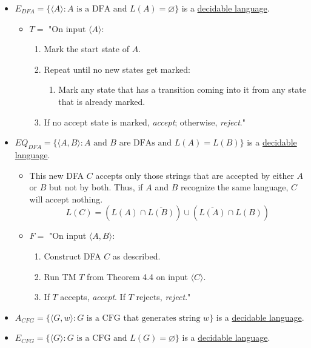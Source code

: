 \documentclass[12pt]{article}
\begin{document}
\begin{itemize}
\item \(E_{DFA}=\{\langle A\rangle : A \text{ is a DFA and } L(A)=\varnothing\}\)
is a \uline{decidable language}.
\begin{itemize}
\item \(T=\) "On input \(\langle A \rangle\):
\begin{enumerate}
\item Mark the start state of \(A\).
\item Repeat until no new states get marked:
\begin{enumerate}
\item Mark any state that has a transition coming into it from any state that
is already marked.
\end{enumerate}
\item If no accept state is marked, \emph{accept}; otherwise, \emph{reject}."
\end{enumerate}
\end{itemize}

\item \(EQ_{DFA}=\{\langle A,B \rangle : A \text{ and } B \text{ are DFAs and }
   L(A)=L(B)\}\) is a \uline{decidable language}.
\begin{itemize}
\item This new DFA \(C\) accepts only those strings that are accepted by either \(A\)
or \(B\) but not by both. Thus, if \(A\) and \(B\) recognize the same language,
\(C\) will accept nothing.
$$L(C)=\left(L(A) \cap \overline{L(B)}\right) \cup
     \left(\overline{L(A)} \cap L(B)\right)$$
\item \(F=\) "On input \(\langle{}A,B\rangle\):
\begin{enumerate}
\item Construct DFA \(C\) as described.
\item Run TM \(T\) from Theorem 4.4 on input \(\langle{}C\rangle\).
\item If \(T\) accepts, \emph{accept}. If \(T\) rejects, \emph{reject}."
\end{enumerate}
\end{itemize}

\item \(A_{CFG}=\{\langle{}G,w\rangle : G \text{ is a CFG that generates string }
   w\}\) is a \uline{decidable language}.

\item \(E_{CFG}=\{\langle{}G\rangle : G \text{ is a CFG and } L(G)=\varnothing\}\)
is a \uline{decidable language}.
\end{itemize}
\end{document}
